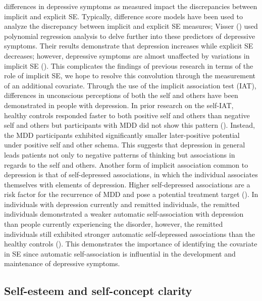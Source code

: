 \documentclass[
  man,
  floatsintext,
  longtable,
  nolmodern,
  notxfonts,
  notimes,
  colorlinks=true,linkcolor=blue,citecolor=blue,urlcolor=blue]{apa7}
\begin{document}
differences in depressive symptoms as measured impact the discrepancies
between implicit and explicit SE. Typically, difference score models
have been used to analyze the discrepancy between implicit and explicit
SE measures; Visser () used
polynomial regression analysis to delve further into these predictors of
depressive symptoms. Their results demonstrate that depression increases
while explicit SE decreases; however, depressive symptoms are almost
unaffected by variations in implicit SE
(). This complicates the
findings of previous research in terms of the role of implicit SE, we
hope to resolve this convolution through the measurement of an
additional covariate. Through the use of the implicit association test
(IAT), differences in unconscious perceptions of both the self and
others have been demonstrated in people with depression. In prior
research on the self-IAT, healthy controls responded faster to both
positive self and others than negative self and others but participants
with MDD did not show this pattern
(). Instead, the
MDD participants exhibited significantly smaller later-positive
potential under positive self and other schema. This suggests that
depression in general leads patients not only to negative patterns of
thinking but associations in regards to the self and others. Another
form of implicit association common to depression is that of
self-depressed associations, in which the individual associates
themselves with elements of depression. Higher self-depressed
associations are a risk factor for the recurrence of MDD and pose a
potential treatment target (). In individuals with depression currently and remitted
individuals, the remitted individuals demonstrated a weaker automatic
self-association with depression than people currently experiencing the
disorder, however, the remitted individuals still exhibited stronger
automatic self-depressed associations than the healthy controls
(). This demonstrates the importance of identifying the covariate in
SE since automatic self-association is influential in the development
and maintenance of depressive symptoms.

\subsection{Self-esteem and self-concept
clarity}\label{self-esteem-and-self-concept-clarity}
\end{document}
